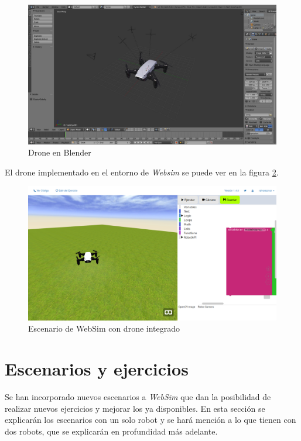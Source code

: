  \begin{figure}
    \centering
    \includegraphics[scale=0.3]{img/droneBlender.jpg}
    \caption{Drone en Blender} \label{fig:droneBlender}
\end{figure}

El drone implementado en el entorno de \textit{Websim} se puede ver en la figura \ref{fig:escenarioDrone}.
   \begin{figure}[H]
    \centering
    \includegraphics[scale=0.3]{img/websimDrone.png}
    \caption{Escenario de WebSim con drone integrado} \label{fig:escenarioDrone}
    \end{figure}


\section{Escenarios y ejercicios}
\label{sec:escenarios}

Se han incorporado nuevos escenarios a \textit{WebSim} que dan la posibilidad de realizar nuevos ejercicios y  mejorar los ya disponibles. En esta sección se explicarán los escenarios con un solo robot y se hará mención a lo que tienen con dos robots, que se explicarán en profundidad más adelante.

